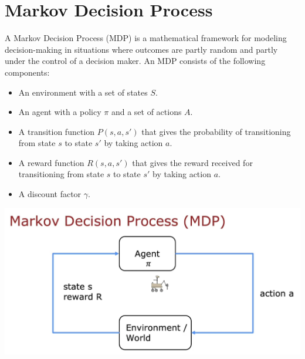 \section{Markov Decision Process}
A Markov Decision Process (MDP) is a mathematical framework for modeling 
decision-making in situations where outcomes are partly random and partly under the control of a 
decision maker. An MDP consists of the following components:
\begin{itemize}
    \item An environment with a set of states $S$.
    \item An agent with a policy $\pi$ and a set of actions $A$.
    \item A transition function $P(s, a, s')$ that gives the probability of transitioning from state $s$ to state $s'$ 
    by taking action $a$.
    \item A reward function $R(s, a, s')$ that gives the reward received for transitioning from state $s$ to state $s'$ by taking action $a$.
    \item A discount factor $\gamma$.
\end{itemize}
\includegraphics*[width=\textwidth]{images/17.4}

